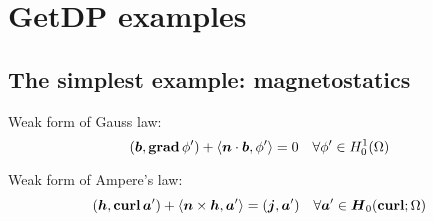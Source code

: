 
\part{GetDP examples}

\chapter{The simplest example: magnetostatics}

\begin{slide}


\begin{slideitemize}
\item Weak form of Gauss law: 
\begin{equation*}
\ivol{\vec{b}}{\Grad{\phi'}} + \isur{\psca{\vec{n}}{\vec{b}}}{\phi'} 
= 0
\quad \forall\phi'\in\Hone[_0]{\Omega}
\end{equation*}

\item Weak form of Ampere's law:
\begin{equation*}
\ivol{\vec{h}}{\Curl{\vec{a}'}} + \isur{\pvec{\vec{n}}{\vec{h}}}{\vec{a}'}
= \ivol{\vec{j}}{\vec{a}'} 
\quad \forall\vec{a}'\in\Hcurl[_0]{\Omega}
\end{equation*}

\end{slideitemize}

\end{slide}

